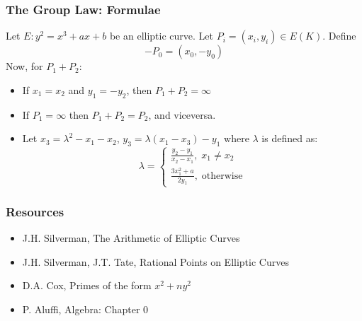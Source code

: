 \documentclass{beamer}
\begin{document}
\begin{frame}
    \frametitle{The Group Law: Formulae}
    Let $E: y^2 = x^3 + a x + b$ be an elliptic curve. Let $P_i = (x_i, y_i) \in E(K)$. Define 
    \[ -P_0 = (x_0, -y_0 )\]
    Now, for $P_1 + P_2$: 
    \begin{itemize}
        \item If $x_1 = x_2$ and $y_1 = -y_2$, then $P_1 + P_2 = \infty$
        \item If $P_1 = \infty$ then $P_1 + P_2 = P_2$, and viceversa.
        \item Let $x_3 = \lambda^2 - x_1 - x_2$, $y_3 = \lambda(x_1 - x_3) - y_1$ where $\lambda$ is defined as:
        \[ \lambda = \begin{cases}
            \frac{y_2 - y_1}{x_2 - x_1}, \; x_1 \neq x_2 \\
            \frac{3 x_1^2 + a}{2y_1},\; \text{otherwise}
        \end{cases} \]
    \end{itemize}
    
\end{frame}

\begin{frame}
    \frametitle{}

    

\end{frame}

\begin{frame}
    \frametitle{Resources}
    \begin{itemize}
        \item  J.H. Silverman, The Arithmetic of Elliptic Curves
        \item  J.H. Silverman, J.T. Tate, Rational Points on Elliptic Curves 
        \item  D.A. Cox, Primes of the form $x^2 + n y^2$
        \item  P. Aluffi, Algebra: Chapter 0
    \end{itemize}
\end{frame}
\end{document}
